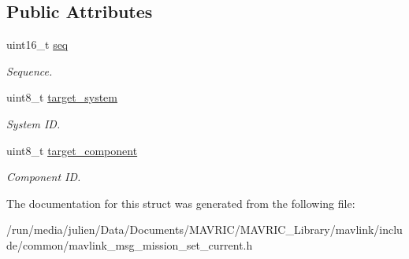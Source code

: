 \subsection*{Public Attributes}
\begin{DoxyCompactItemize}
\item 
\hypertarget{struct____mavlink__mission__set__current__t_add7d7aa3830c71875706ac4e8e5206aa}{uint16\+\_\+t \hyperlink{struct____mavlink__mission__set__current__t_add7d7aa3830c71875706ac4e8e5206aa}{seq}}\label{struct____mavlink__mission__set__current__t_add7d7aa3830c71875706ac4e8e5206aa}

\begin{DoxyCompactList}\small\item\em Sequence. \end{DoxyCompactList}\item 
\hypertarget{struct____mavlink__mission__set__current__t_aa9499477334421047ddb7b3d8e4b7794}{uint8\+\_\+t \hyperlink{struct____mavlink__mission__set__current__t_aa9499477334421047ddb7b3d8e4b7794}{target\+\_\+system}}\label{struct____mavlink__mission__set__current__t_aa9499477334421047ddb7b3d8e4b7794}

\begin{DoxyCompactList}\small\item\em System I\+D. \end{DoxyCompactList}\item 
\hypertarget{struct____mavlink__mission__set__current__t_a367ad0a39fa1fc6d06ee1aa06a9a6908}{uint8\+\_\+t \hyperlink{struct____mavlink__mission__set__current__t_a367ad0a39fa1fc6d06ee1aa06a9a6908}{target\+\_\+component}}\label{struct____mavlink__mission__set__current__t_a367ad0a39fa1fc6d06ee1aa06a9a6908}

\begin{DoxyCompactList}\small\item\em Component I\+D. \end{DoxyCompactList}\end{DoxyCompactItemize}


The documentation for this struct was generated from the following file\+:\begin{DoxyCompactItemize}
\item 
/run/media/julien/\+Data/\+Documents/\+M\+A\+V\+R\+I\+C/\+M\+A\+V\+R\+I\+C\+\_\+\+Library/mavlink/include/common/mavlink\+\_\+msg\+\_\+mission\+\_\+set\+\_\+current.\+h\end{DoxyCompactItemize}
